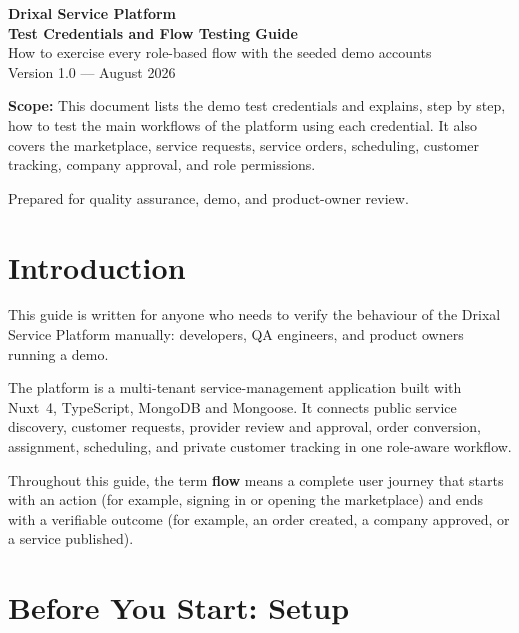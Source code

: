 \documentclass[11pt,a4paper]{article}
\begin{document}
\begin{titlepage}
  \centering
  \vspace*{2.5cm}
  {\Huge\bfseries\color{drixalblue} Drixal Service Platform}\\[0.6cm]
  {\Large\bfseries Test Credentials and Flow Testing Guide}\\[1.2cm]
  {\large\color{drixalmuted} How to exercise every role-based flow with the seeded demo accounts}\\[0.4cm]
  {\large\color{drixalmuted} Version 1.0 --- August 2026}\\[2cm]
  \begin{notebox}
    \textbf{Scope:} This document lists the demo test credentials and explains, step by step, how to test the main workflows of the platform using each credential. It also covers the marketplace, service requests, service orders, scheduling, customer tracking, company approval, and role permissions.
  \end{notebox}
  \vfill
  {\small\color{drixalmuted} Prepared for quality assurance, demo, and product-owner review.}
\end{titlepage}

\section{Introduction}
\label{sec:intro}

This guide is written for anyone who needs to verify the behaviour of the Drixal Service Platform manually: developers, QA engineers, and product owners running a demo.

The platform is a multi-tenant service-management application built with Nuxt~4, TypeScript, MongoDB and Mongoose. It connects public service discovery, customer requests, provider review and approval, order conversion, assignment, scheduling, and private customer tracking in one role-aware workflow.

Throughout this guide, the term \textbf{flow} means a complete user journey that starts with an action (for example, signing in or opening the marketplace) and ends with a verifiable outcome (for example, an order created, a company approved, or a service published).

\section{Before You Start: Setup}
\label{sec:setup}
\end{document}

